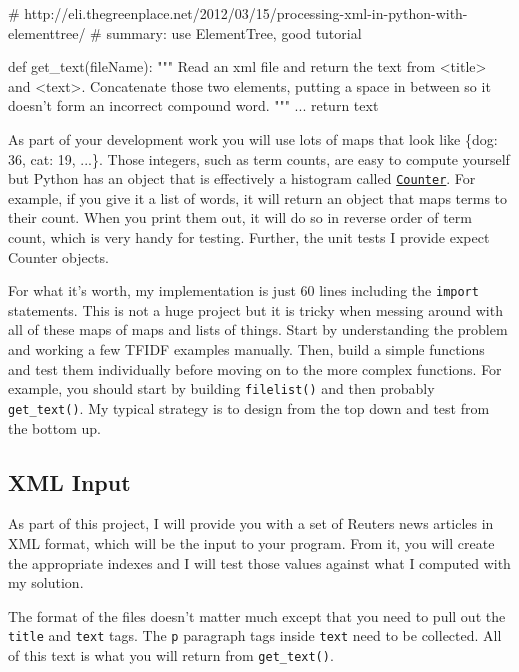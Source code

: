 \begin{fullwidth}
\begin{pyverbatim}
# http://eli.thegreenplace.net/2012/03/15/processing-xml-in-python-with-elementtree/
# summary: use ElementTree, good tutorial

def get_text(fileName):
    """
    Read an xml file and return the text from <title> and <text>.
    Concatenate those two elements, putting a space in between so it doesn't
    form an incorrect compound word.    
    """
    ...
    return text
\end{pyverbatim}

As part of your development work you will use lots of maps that look like \{dog: 36, cat: 19, ...\}.   Those integers, such as term counts, are easy to compute yourself but Python has an object that is effectively a histogram called \href{https://docs.python.org/2/library/collections.html#collections.Counter}{{\tt Counter}}. For example, if you give it a list of words, it will return an object that maps terms to their count. When you print them out, it will do so in reverse order of term count, which is very handy for testing.  Further, the unit tests I provide expect Counter objects.

For what it's worth, my implementation is just 60 lines including the {\tt import} statements. This is not a huge project but it is tricky when messing around with all of these maps of maps and lists of things. Start by understanding the problem and working a few TFIDF examples manually. Then, build a simple functions and test them individually before moving on to the more complex functions. For example, you should start by building {\tt filelist()} and then probably {\tt get\_text()}. My typical strategy is to design from the top down and test from the bottom up.

\subsection{XML Input}

As part of this project, I will provide you with a set of Reuters news articles in XML format, which will be the input to your program. From it, you will create the appropriate indexes and I will test those values against what I computed with my solution.

The format of the files doesn't matter much except that you need to pull out the {\tt title} and {\tt text} tags. The {\tt p} paragraph tags inside {\tt text} need to be collected. All of this text is what you will return from {\tt get\_text()}.
 

\end{fullwidth}

